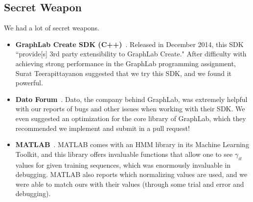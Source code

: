 \subsection{Secret Weapon}

We had a lot of secret weapons. 

\begin{itemize}
    \item \textbf{GraphLab Create SDK (C++)}~\cite{graphlab-create}.  Released in December 2014, this SDK ``provide[s] 3rd party extensibility to GraphLab Create."  After difficulty with achieving strong performance in the GraphLab programming assignment, Surat Teerapittayanon suggested that we try this SDK, and we found it powerful.

    \item \textbf{Dato Forum}~\cite{datoforum}.  Dato, the company behind GraphLab, was extremely helpful with our reports of bugs and other issues when working with their SDK.  We even suggested an optimization for the core library of GraphLab, which they recommended we implement and submit in a pull request!

\item \textbf{MATLAB}~\cite{matlab}.  MATLAB comes with an HMM library in its Machine Learning Toolkit, and this library offers invaluable functions that allow one to see $\gamma_{it}$ values for given training sequences, which was enormously invaluable in debugging.  MATLAB also reports which normalizing values are used, and we were able to match ours with their values (through some trial and error and debugging).
\end{itemize}
